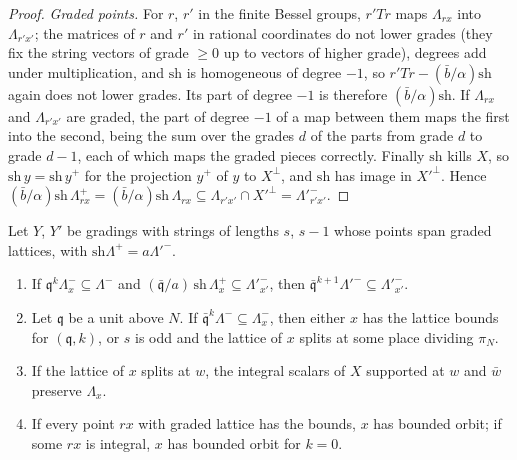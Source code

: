 \begin{proof}
\emph{Graded points.} For $r$, $r'$ in the finite Bessel groups, $r'Tr$ maps $\Lambda_{rx}$ into $\Lambda_{r'x'}$; the matrices of $r$ and $r'$ in rational coordinates do not lower grades (they fix the string vectors of grade $\ge0$ up to vectors of higher grade), degrees add under multiplication, and $\mathrm{sh}$ is homogeneous of degree $-1$, so
$r'Tr-(\bar b/\alpha)\mathrm{sh}$ again does not lower grades. Its part of degree $-1$ is therefore $(\bar b/\alpha)\mathrm{sh}$. If $\Lambda_{rx}$ and $\Lambda_{r'x'}$ are graded, the part of degree $-1$ of a map between them maps the first into the second, being the sum over the grades $d$ of the parts from grade $d$ to grade $d-1$, each of which
maps the graded pieces correctly. Finally $\mathrm{sh}$ kills $X$, so $\mathrm{sh}\,y=\mathrm{sh}\,y^+$ for the projection $y^+$ of $y$ to $X^\perp$, and $\mathrm{sh}$ has image in $X'^\perp$. Hence $(\bar b/\alpha)\mathrm{sh}\,\Lambda^+_{rx}=(\bar b/\alpha)\mathrm{sh}\,\Lambda_{rx}\subseteq\Lambda_{r'x'}\cap X'^\perp=\Lambda'^-_{r'x'}$.
\end{proof}

\begin{proposition}\label{prop:sandwich}
Let $Y$, $Y'$ be gradings with strings of lengths $s$, $s-1$ whose points span graded lattices, with $\mathrm{sh}\Lambda^+=a\Lambda'^-$.
\begin{enumerate}[label=\textup{(\alph*)}]
\item If $\mathfrak q^k\Lambda^-_x\subseteq\Lambda^-$ and $(\bar{\mathfrak q}/a)\,\mathrm{sh}\,\Lambda^+_x\subseteq\Lambda'^-_{x'}$, then $\bar{\mathfrak q}^{k+1}\Lambda'^-\subseteq\Lambda'^-_{x'}$.
\item Let $\mathfrak q$ be a unit above $N$. If $\bar{\mathfrak q}^k\Lambda^-\subseteq\Lambda^-_x$, then either $x$ has the lattice bounds for
$(\mathfrak q,k)$, or $s$ is odd and the lattice of $x$ splits at some place dividing $\pi_N$.
\item If the lattice of $x$ splits at $w$, the integral scalars of $X$ supported at $w$ and $\bar w$ preserve $\Lambda_x$.
\item If every point $rx$ with graded lattice has the bounds, $x$ has bounded orbit; if some $rx$ is integral, $x$ has
bounded orbit for $k=0$.
\end{enumerate}
\end{proposition}


